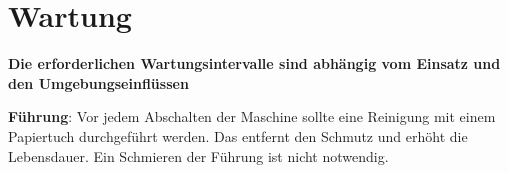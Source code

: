 %
%

\chapter{Wartung}
	\textbf {Die erforderlichen Wartungsintervalle sind abhängig vom Einsatz und den Umgebungseinflüssen}
	
	\item \textbf{Führung}: Vor jedem Abschalten der Maschine sollte eine Reinigung mit einem  Papiertuch durchgeführt werden. Das entfernt den Schmutz und erhöht die Lebensdauer. Ein Schmieren der Führung ist nicht notwendig.
	

